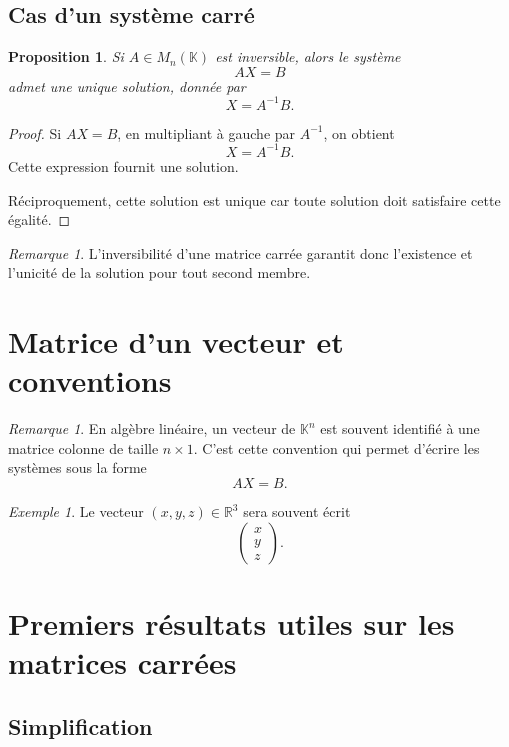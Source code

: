 \documentclass[11pt,a4paper]{article}
\newtheorem{proposition}[definition]{Proposition}
\theoremstyle{remark}
\newtheorem{remarque}[definition]{Remarque}
\newtheorem{exemple}[definition]{Exemple}
\newcommand{\R}{\mathbb{R}}
\newcommand{\K}{\mathbb{K}}
\begin{document}
\subsection{Cas d’un système carré}

\begin{proposition}
Si \(A\in M_n(\K)\) est inversible, alors le système
\[
AX=B
\]
admet une unique solution, donnée par
\[
X=A^{-1}B.
\]
\end{proposition}

\begin{proof}
Si \(AX=B\), en multipliant à gauche par \(A^{-1}\), on obtient
\[
X=A^{-1}B.
\]
Cette expression fournit une solution.

Réciproquement, cette solution est unique car toute solution doit satisfaire cette égalité.
\end{proof}

\begin{remarque}
L’inversibilité d’une matrice carrée garantit donc l’existence et l’unicité de la solution pour tout second membre.
\end{remarque}

\section{Matrice d’un vecteur et conventions}

\begin{remarque}
En algèbre linéaire, un vecteur de \(\K^n\) est souvent identifié à une matrice colonne de taille \(n\times 1\). C’est cette convention qui permet d’écrire les systèmes sous la forme
\[
AX=B.
\]
\end{remarque}

\begin{exemple}
Le vecteur \((x,y,z)\in\R^3\) sera souvent écrit
\[
\begin{pmatrix}
x\\
y\\
z
\end{pmatrix}.
\]
\end{exemple}

\section{Premiers résultats utiles sur les matrices carrées}

\subsection{Simplification}
\end{document}
